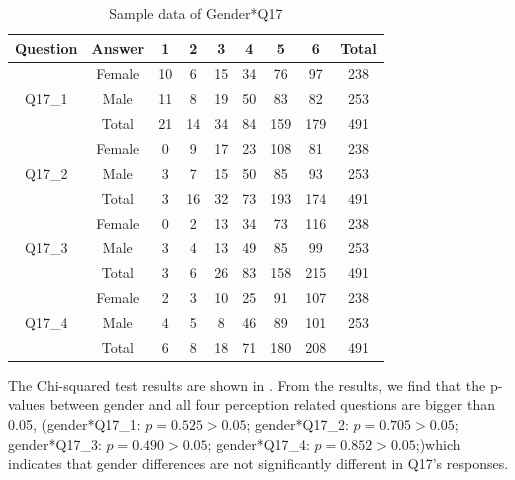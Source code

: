 \begin{table}[h]
  \caption{Sample data of Gender*Q17}
  \label{table30}
  \centering
\begin{tabular}{cc|ccccccc}
\hline
Question & Answer & 1  & 2  & 3  & 4  & 5   & 6   & Total \\
\hline
\multirow{3}{*}{Q17\_1}   & Female & 10 & 6  & 15 & 34 & 76  & 97  & 238                       \\
         & Male   & 11 & 8  & 19 & 50 & 83  & 82  & 253                       \\
         & Total  & 21 & 14 & 34 & 84 & 159 & 179 & 491                       \\
\hline
\multirow{3}{*}{Q17\_2}   & Female & 0  & 9  & 17 & 23 & 108 & 81  & 238                       \\
         & Male   & 3  & 7  & 15 & 50 & 85  & 93  & 253                       \\
         & Total  & 3  & 16 & 32 & 73 & 193 & 174 & 491                       \\
\hline
\multirow{3}{*}{Q17\_3}   & Female & 0  & 2  & 13 & 34 & 73  & 116 & 238                       \\
         & Male   & 3  & 4  & 13 & 49 & 85  & 99  & 253                       \\
         & Total  & 3  & 6  & 26 & 83 & 158 & 215 & 491                       \\
\hline
\multirow{3}{*}{Q17\_4}   & Female & 2  & 3  & 10 & 25 & 91  & 107 & 238                       \\
         & Male   & 4  & 5  & 8  & 46 & 89  & 101 & 253                       \\
         & Total  & 6  & 8  & 18 & 71 & 180 & 208 & 491                     \\
\hline         
\end{tabular}
\end{table}


The Chi-squared test results are shown in . From the results, we find that the p-values between gender and all four perception related questions are bigger than 0.05, (gender*Q17\_1: $p=0.525>0.05$; gender*Q17\_2: $p=0.705>0.05$; gender*Q17\_3: $p=0.490>0.05$; gender*Q17\_4: $p=0.852>0.05$;)which indicates that gender differences are not significantly different in Q17's responses. 


